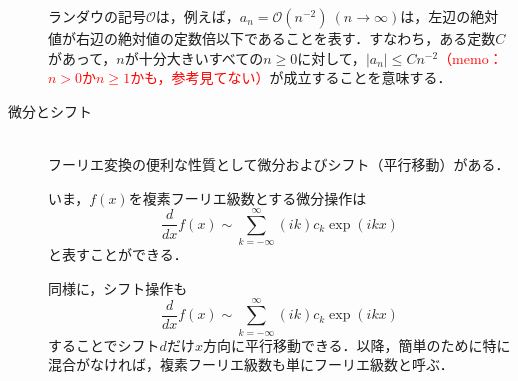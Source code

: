 \documentclass[11pt,a4paper]{jsarticle}
\theoremstyle{definition}
\begin{document}
\begin{description}
    ランダウの記号$\mathcal{O}$は，例えば，$a_n=\mathcal{O}(n^{-2})\ (n\rightarrow\infty)$は，左辺の絶対値が右辺の絶対値の定数倍以下であることを表す．すなわち，ある定数$C$があって，$n$が十分大きいすべての$n\geq 0$に対して，$|a_n|\leq Cn^{-2}$\textcolor{red}{（memo：$n>0 か n\geq 1$かも，参考見てない）}が成立することを意味する．

  \item[微分とシフト]
    \quad\\
    フーリエ変換の便利な性質として微分およびシフト（平行移動）がある．

    いま，$f(x)$を複素フーリエ級数とする微分操作は
    \begin{equation*}
      \frac{d}{dx}f(x) \sim \sum_{k=-\infty}^{\infty} (ik)c_k \exp(ikx)
    \end{equation*}
    と表すことができる．

    同様に，シフト操作も
    \begin{equation*}
      \frac{d}{dx}f(x) \sim \sum_{k=-\infty}^{\infty} (ik)c_k \exp(ikx)
    \end{equation*}
    することでシフト$d$だけ$x$方向に平行移動できる．以降，簡単のために特に混合がなければ，複素フーリエ級数も単にフーリエ級数と呼ぶ．
\end{description}
\end{document}
